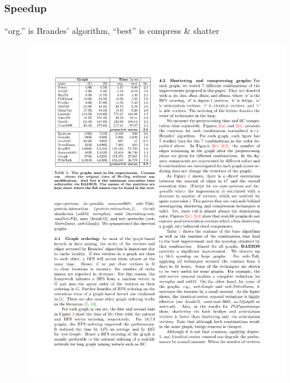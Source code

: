 \begin{frame}
  \frametitle{Speedup}
  ``org.'' is Brandes' algorithm, ``best'' is compress \& shatter
  \begin{figure}
    \includegraphics{figs/runtimebadios.pdf}
  \end{figure}
\end{frame}

